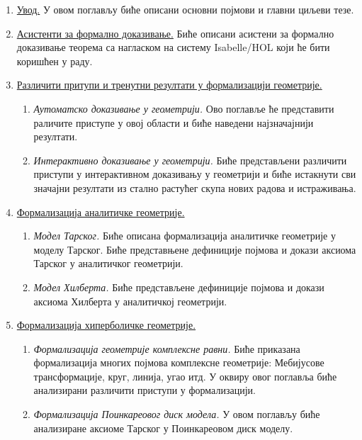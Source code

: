 \documentclass{article}
\begin{document}
\begin{enumerate}
\item \underline{Увод.} У овом поглављу биће описани основни појмови и главни циљеви тезе.

\item \underline{Асистенти за формално доказивање.} Биће описани асистени за формално доказивање
      теорема са нагласком на систему {\lat Isabelle/HOL} који ће бити коришћен у раду. 
      
\item \underline{Различити притупи и тренутни резултати у формализацији геометрије.}
      \begin{enumerate}[label*=\arabic*.]
      \item {\em Аутоматско доказивање у геометрији.} Ово поглавље ће представити раличите приступе 
            у овој области и биће наведени најзначајнији резултати.
      \item {\em Интерактивно доказивање у геометрији.}  Биће представљени различити приступи у 
           интерактивном доказивању у геометрији и биће истакнути сви значајни резултати из стално 
           растућег скупа нових радова и истраживања.
      \end{enumerate}

\item \underline{Формализација аналитичке геометрије.}
      \begin{enumerate}[label*=\arabic*.]
      \item {\em Модел Тарског.} Биће описана формализација аналитичке геометрије у моделу Тарског. Биће
            представњене дефиниције појмова и докази аксиома Тарског у аналитичког геометрији.
      \item {\em Модел Хилберта.} Биће представљене дефиниције појмова и докази аксиома Хилберта у
            аналитичкој геометрији.
      \end{enumerate}
      
\item \underline{Формализација хиперболичке геометрије.}
      \begin{enumerate}[label*=\arabic*.]
      \item {\em Формализација геометрије комплексне равни.} Биће приказана формализација многих појмова комплексне геометрије: Мебијусове
            трансформације, круг, линија, угао итд. У оквиру овог поглавља биће анализирани различити приступи у формализацији.
      \item {\em Формализација Поинкареовог диск модела.} У овом поглављу биће анализиране аксиоме Тарског у Поинкареовом диск моделу.
      \end{enumerate}


\end{enumerate}
\end{document}
